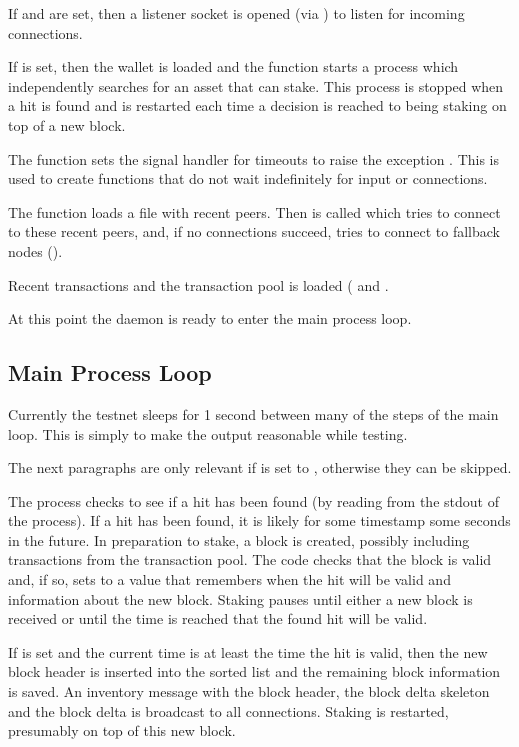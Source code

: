 If {} and {} are set, then a listener socket is opened (via {})
to listen for incoming connections.

If {} is set, then the wallet is loaded and the function {}
starts a {} process which independently searches for an asset that can stake.
This process is stopped when a hit is found and is restarted each time a decision is reached
to being staking on top of a new block.

The function {} sets the signal handler for timeouts to raise the exception {}.
This is used to create functions that do not wait indefinitely for input or connections.

The function {} loads a file with recent peers.
Then {} is called which tries to connect to these recent peers,
and, if no connections succeed, tries to connect to fallback nodes ({}).

Recent transactions and the transaction pool is loaded ({} and {}.

At this point the daemon is ready to enter the main process loop.

\subsection{Main Process Loop}

Currently the testnet sleeps for 1 second between many of the steps of the main loop.
This is simply to make the output reasonable while testing.

The next paragraphs are only relevant if {} is set to {},
otherwise they can be skipped.

The process checks to see if a hit has been found (by reading from the
stdout of the {} process). If a hit has been found, it is likely
for some timestamp some seconds in the future.
In preparation to stake, a block is created, possibly including transactions from the transaction pool.
The code checks that the block is valid and, if so, sets {}
to a value that remembers when the hit will be valid and information about the new block.
Staking pauses until either a new block is received or until the time is reached
that the found hit will be valid.

If {} is set and the current time is at least the time the hit is valid,
then the new block header is inserted into the sorted {} list
and the remaining block information is saved.
An inventory message with the block header, the block delta skeleton and the block delta
is broadcast to all connections.
Staking is restarted, presumably on top of this new block.

